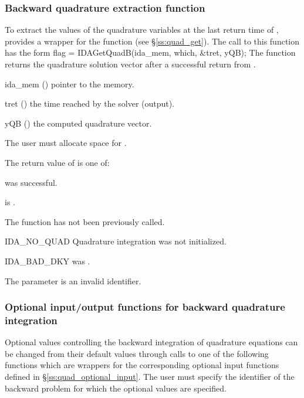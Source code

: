 \subsubsection{Backward quadrature extraction function}
\label{sss:quad_get_b}
To extract the values of the quadrature variables at the last return time
of , {\idas} provides a wrapper for the function 
(see \S\ref{ss:quad_get}). The call to this function has the form
{
  flag = IDAGetQuadB(ida\_mem, which, \&tret, yQB);
}
{
  The function  returns the quadrature solution vector after
  a successful return from .
}
{
  \begin{args}
  \item[ida\_mem] ()
    pointer to the {\idas} memory.
  \item[tret] ()
    the time reached by the solver (output).
  \item[yQB] ()
    the computed quadrature vector.
  \end{args}
}
  {\warn} The user must allocate space for .
{
  The return value  of  is one of:
  \begin{args}
  \item[\Id{IDA\_SUCCESS}] 
     was successful.
  \item[\Id{IDA\_MEM\_NULL}] 
     is .
  \item[\Id{IDA\_NO\_ADJ}]
    The function  has not been previously called.
  \item[IDA\_NO\_QUAD] 
    Quadrature integration was not initialized.
  \item[IDA\_BAD\_DKY] 
     was .
  \item[\Id{IDA\_ILL\_INPUT}]
    The parameter  is an invalid identifier.
  \end{args}
}
{}

\subsubsection{Optional input/output functions for backward quadrature integration}
\label{sss:quad_optional_input_B}
Optional values controlling the backward integration of quadrature equations can be 
changed from their default values through calls to one of the following functions 
which are wrappers for the corresponding optional input functions defined in 
\S\ref{ss:quad_optional_input}. The user must specify  the identifier  
of the backward problem for which the optional values are specified.

